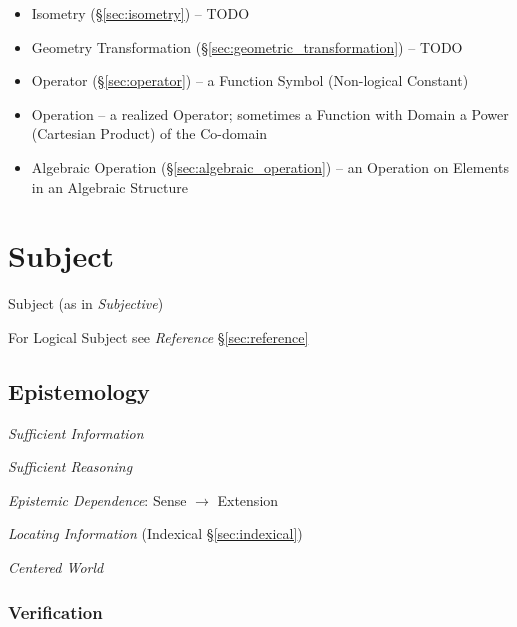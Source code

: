 \begin{itemize}
\begin{itemize}
    \end{itemize}
  \item Isometry (\S\ref{sec:isometry}) -- TODO
  \item Geometry Transformation (\S\ref{sec:geometric_transformation}) -- TODO
  \item Operator (\S\ref{sec:operator}) -- a Function Symbol (Non-logical
    Constant)
  \item Operation -- a realized Operator; sometimes a Function with Domain a
    Power (Cartesian Product) of the Co-domain
  \item Algebraic Operation (\S\ref{sec:algebraic_operation}) -- an Operation on
    Elements in an Algebraic Structure
\end{itemize}



\section{Subject}\label{sec:subject}

Subject (as in \emph{Subjective})

For Logical Subject see \emph{Reference} \S\ref{sec:reference}



\subsection{Epistemology}\label{sec:epistemology}
\cite{chalmers02}

\emph{Sufficient Information}

\emph{Sufficient Reasoning}

\emph{Epistemic Dependence}: Sense $\rightarrow$ Extension

\emph{Locating Information} (Indexical \S\ref{sec:indexical})

\emph{Centered World}



\subsubsection{Verification}\label{sec:verification}



